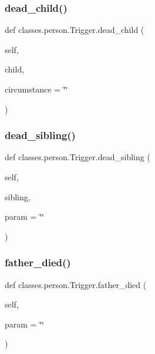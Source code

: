 \subsubsection{\texorpdfstring{dead\+\_\+child()}{dead\_child()}}
{\footnotesize\ttfamily def classes.\+person.\+Trigger.\+dead\+\_\+child (\begin{DoxyParamCaption}\item[{}]{self,  }\item[{}]{child,  }\item[{}]{circumstance = {\ttfamily \char`\"{}\char`\"{}} }\end{DoxyParamCaption})}

\mbox{\label{classclasses_1_1person_1_1Trigger_a53b782afb7beb24dcc7c82f9dd9eef06}} 
\subsubsection{\texorpdfstring{dead\+\_\+sibling()}{dead\_sibling()}}
{\footnotesize\ttfamily def classes.\+person.\+Trigger.\+dead\+\_\+sibling (\begin{DoxyParamCaption}\item[{}]{self,  }\item[{}]{sibling,  }\item[{}]{param = {\ttfamily \char`\"{}\char`\"{}} }\end{DoxyParamCaption})}

\mbox{\label{classclasses_1_1person_1_1Trigger_a97106d2f4ff48e3bacf867095f58b30f}} 
\subsubsection{\texorpdfstring{father\+\_\+died()}{father\_died()}}
{\footnotesize\ttfamily def classes.\+person.\+Trigger.\+father\+\_\+died (\begin{DoxyParamCaption}\item[{}]{self,  }\item[{}]{param = {\ttfamily \char`\"{}\char`\"{}} }\end{DoxyParamCaption})}


